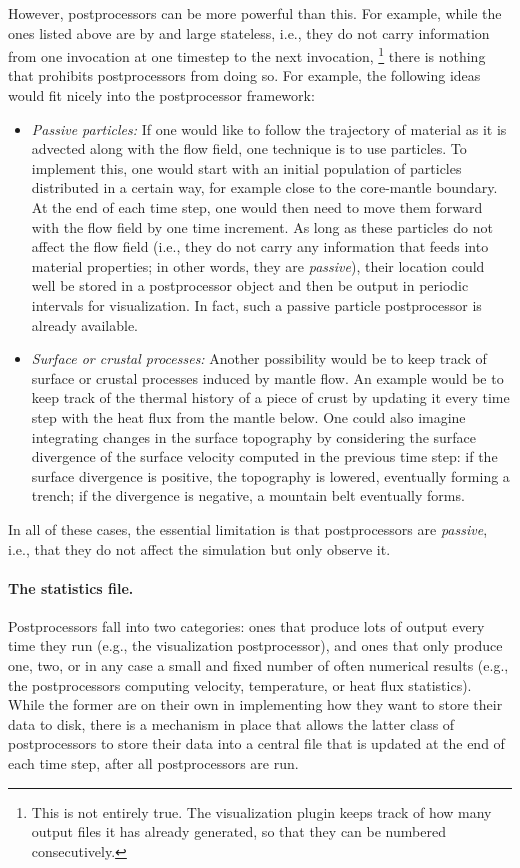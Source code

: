 \documentclass{article}
\begin{document}
However, postprocessors can be more powerful than this. For example, while the
ones listed above are by and large stateless, i.e., they do not carry
information from one invocation at one timestep to the next invocation,%
\footnote{This is not entirely true. The visualization plugin keeps track of
  how many output files it has already generated, so that they can be numbered
  consecutively.}
there is nothing that prohibits postprocessors from doing so. For example, the
following ideas would fit nicely into the postprocessor framework:
\begin{itemize}
\item \textit{Passive particles:} If one would like to follow the trajectory of
  material as it is advected along with the flow field, one technique is to
  use particles. To implement this, one would start with an initial
  population of particles distributed in a certain way, for example close to
  the core-mantle boundary. At the end of each time step, one would then need
  to move them forward with the flow field by one time increment. As long as
  these particles do not affect the flow field (i.e., they do not carry any
  information that feeds into material properties; in other words, they are
  \textit{passive}), their location could well
  be stored in a postprocessor object and then be output in periodic intervals
  for visualization. In fact, such a passive particle postprocessor is already
  available.

\item \textit{Surface or crustal processes:} Another possibility would be to keep track
  of surface or crustal processes induced by mantle flow. An example would be
  to keep track of the thermal history of a piece of crust by updating it
  every time step with the heat flux from the mantle below. One could also
  imagine integrating changes in the surface topography by considering the
  surface divergence of the surface velocity computed in the previous time
  step: if the surface divergence is positive, the topography is lowered,
  eventually forming a trench; if the divergence is negative, a mountain belt
  eventually forms.
\end{itemize}
In all of these cases, the essential limitation is that postprocessors are
\textit{passive}, i.e., that they do not affect the simulation but only
observe it.

\paragraph{The statistics file.}
Postprocessors fall into two categories: ones that produce lots of output
every time they run (e.g., the visualization postprocessor), and ones that
only produce one, two, or in any case a small and fixed number of often
numerical results (e.g., the postprocessors computing velocity, temperature,
or heat flux statistics). While the former are on their own in implementing
how they want to store their data to disk, there is a mechanism in place that
allows the latter class of postprocessors to store their data into a central
file that is updated at the end of each time step, after all postprocessors
are run.
\end{document}
